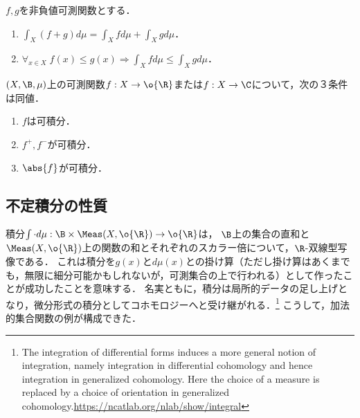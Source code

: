 \documentclass[uplatex, dvipdfmx]{jsreport}
\begin{document}
\begin{lemma}[非負値可測関数の紡ぐ論理]\label{lemma-integral-for-nonnegative-measurables}
    $f,g$を非負値可測関数とする．
    \begin{enumerate}
        \item $\int_X(f+g)d\mu=\int_Xfd\mu+\int_Xgd\mu$．
        \item $\forall_{x\in X}\;f(x)\le g(x)\Rightarrow\int_Xfd\mu\le\int_Xgd\mu$．
    \end{enumerate}
\end{lemma}

\begin{theorem}[可積分性の特徴付け]\label{thm-characterization-of-integrability}
    $(X,\B,\mu)$上の可測関数$f:X\to\o{\R}$または$f:X\to\C$について，次の３条件は同値．
    \begin{enumerate}
        \item $f$は可積分．
        \item $f^+,f^-$が可積分．
        \item $\abs{f}$が可積分．
    \end{enumerate}
\end{theorem}

\subsection{不定積分の性質}

\begin{tcolorbox}[colframe=ForestGreen, colback=ForestGreen!10!white,breakable,colbacktitle=ForestGreen!40!white,coltitle=black,fonttitle=\bfseries\sffamily,
title=]
    積分$\int\cdot d\mu:\B\times\Meas(X,\o{\R})\to\o{\R}$は，
    $\B$上の集合の直和と$\Meas(X,\o{\R})$上の関数の和とそれぞれのスカラー倍について，$\R$-双線型写像である．
    これは積分を$g(x)$と$d\mu(x)$との掛け算（ただし掛け算はあくまでも，無限に細分可能かもしれないが，可測集合の上で行われる）として作ったことが成功したことを意味する．
    名実ともに，積分は局所的データの足し上げとなり，微分形式の積分としてコホモロジーへと受け継がれる．\footnote{The integration of differential forms induces a more general notion of integration, namely integration in differential cohomology and hence integration in generalized cohomology. Here the choice of a measure is replaced by a choice of orientation in generalized cohomology.\url{https://ncatlab.org/nlab/show/integral}}
    こうして，加法的集合関数の例が構成できた．
\end{tcolorbox}
\end{document}
